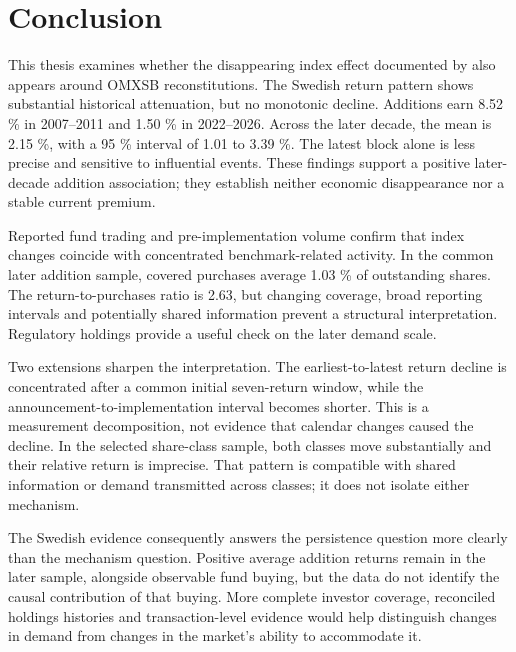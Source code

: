 \section{Conclusion}

This thesis examines whether the disappearing index effect documented by \citet{greenwood2025} also appears around OMXSB reconstitutions. The Swedish return pattern shows substantial historical attenuation, but no monotonic decline. Additions earn 8.52 \% in 2007--2011 and 1.50 \% in 2022--2026. Across the later decade, the mean is 2.15 \%, with a 95 \% interval of 1.01 to 3.39 \%. The latest block alone is less precise and sensitive to influential events. These findings support a positive later-decade addition association; they establish neither economic disappearance nor a stable current premium.

Reported fund trading and pre-implementation volume confirm that index changes coincide with concentrated benchmark-related activity. In the common later addition sample, covered purchases average 1.03 \% of outstanding shares. The return-to-purchases ratio is 2.63, but changing coverage, broad reporting intervals and potentially shared information prevent a structural interpretation. Regulatory holdings provide a useful check on the later demand scale.

Two extensions sharpen the interpretation. The earliest-to-latest return decline is concentrated after a common initial seven-return window, while the announcement-to-implementation interval becomes shorter. This is a measurement decomposition, not evidence that calendar changes caused the decline. In the selected share-class sample, both classes move substantially and their relative return is imprecise. That pattern is compatible with shared information or demand transmitted across classes; it does not isolate either mechanism.

The Swedish evidence consequently answers the persistence question more clearly than the mechanism question. Positive average addition returns remain in the later sample, alongside observable fund buying, but the data do not identify the causal contribution of that buying. More complete investor coverage, reconciled holdings histories and transaction-level evidence would help distinguish changes in demand from changes in the market's ability to accommodate it.
